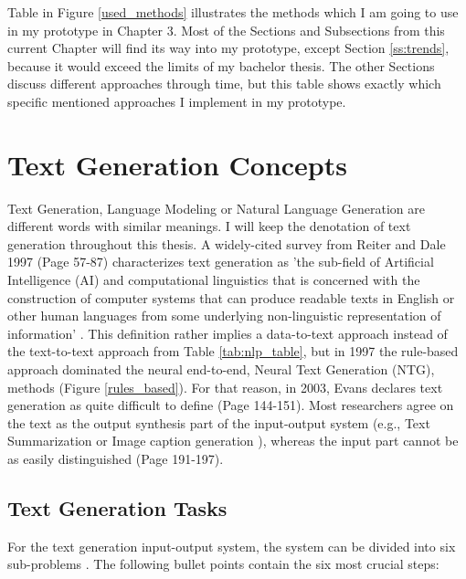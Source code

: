 Table in Figure \ref{used_methods} illustrates the methods which I am going to use in my prototype in Chapter 3. Most of the Sections and Subsections from this current Chapter will find its way into my prototype, except Section \ref{ss:trends}, because it would exceed the limits of my bachelor thesis. The other Sections discuss different approaches through time, but this table shows exactly which specific mentioned approaches I implement in my prototype.


\section{Text Generation Concepts}\label{ss:history}

Text Generation, Language Modeling or Natural Language Generation are different words with similar meanings. I will keep the denotation of text generation throughout this thesis. A widely-cited survey from Reiter and Dale 1997 (Page 57-87) \cite{reiter} characterizes text generation as 'the sub-field of Artificial Intelligence (AI) and computational linguistics that is concerned with the construction of computer systems that can produce readable texts in English or other human languages from some underlying non-linguistic representation of information' \cite{reiter}. This definition rather implies a data-to-text approach instead of the text-to-text approach from Table \ref{tab:nlp_table}, but in 1997 the rule-based approach dominated the neural end-to-end, Neural Text Generation (NTG), methods (Figure \ref{rules_based}). For that reason, in 2003, Evans declares text generation as quite difficult to define \cite{evans} (Page 144-151). Most researchers agree on the text as the output synthesis part of the input-output system (e.g., Text Summarization or Image caption generation \cite{mitchell}), whereas the input part cannot be as easily distinguished \cite{mcdonald} (Page 191-197).

\subsection{Text Generation Tasks}

For the text generation input-output system, the system can be divided into six sub-problems \cite{reiter}. The following bullet points contain the six most crucial steps:

